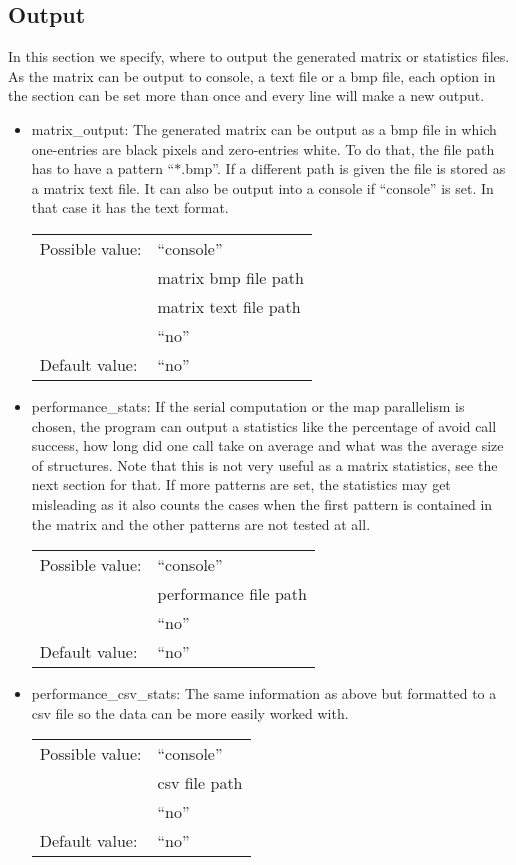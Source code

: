 \subsection{Output}
In this section we specify, where to output the generated matrix or statistics files. As the matrix can be output to console, a text file or a bmp file, each option in the section can be set more than once and every line will make a new output.
\begin{itemize}
\item matrix\_output: The generated matrix can be output as a bmp file in which one-entries are black pixels and zero-entries white. To do that, the file path has to have a pattern ``$\ast$.bmp''. If a different path is given the file is stored as a matrix text file. It can also be output into a console if ``console'' is set. In that case it has the text format.

\begin{tabular}{ll}
Possible value: & ``console'' \\
& matrix bmp file path \\
& matrix text file path \\
& ``no'' \\
Default value: & ``no''
\end{tabular}

\item performance\_stats: If the serial computation or the map parallelism is chosen, the program can output a statistics like the percentage of avoid call success, how long did one call take on average and what was the average size of structures. Note that this is not very useful as a matrix statistics, see the next section for that. If more patterns are set, the statistics may get misleading as it also counts the cases when the first pattern is contained in the matrix and the other patterns are not tested at all.

\begin{tabular}{ll}
Possible value: & ``console'' \\
& performance file path \\
& ``no'' \\
Default value: & ``no''
\end{tabular}

\item performance\_csv\_stats: The same information as above but formatted to a csv file so the data can be more easily worked with.

\begin{tabular}{ll}
Possible value: & ``console'' \\
& csv file path \\
& ``no'' \\
Default value: & ``no''
\end{tabular}


\end{itemize}
